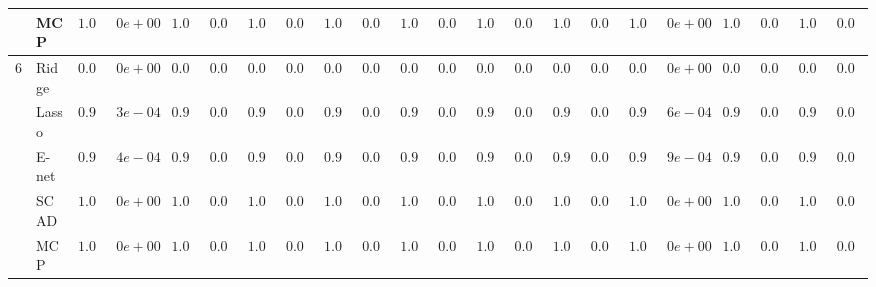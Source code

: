 \begin{tabular}{p{0.2cm}p{1cm}|p{0.6cm}p{0.6cm}|p{0.6cm}p{0.6cm}p{0.6cm}p{0.6cm}p{0.6cm}p{0.6cm}|p{0.6cm}p{0.6cm}p{0.6cm}p{0.6cm}p{0.6cm}p{0.6cm}|p{0.6cm}p{0.6cm}p{0.6cm}p{0.6cm}p{0.6cm}p{0.6cm}}
 & MCP  & $1.0000$ & $0e+00$ & $1.0000$ & $0.0000$ & $1.0000$ & $0.0000$ & $1.0000$ & $0.0000$ & $1.0000$ & $0.0001$ & $1.0000$ & $0.0000$ & $1.0000$ & $0.0000$ & $1.0000$ & $0e+00$ & $1.0000$ & $0.0000$ & $1.0000$ & $0.0000$ \\\hline
6 & Ridge  & $0.0000$ & $0e+00$ & $0.0000$ & $0.0000$ & $0.0000$ & $0.0000$ & $0.0000$ & $0.0000$ & $0.0000$ & $0.0000$ & $0.0000$ & $0.0000$ & $0.0000$ & $0.0000$ & $0.0000$ & $0e+00$ & $0.0000$ & $0.0000$ & $0.0000$ & $0.0000$ \\
 & Lasso  & $0.9999$ & $3e-04$ & $0.9991$ & $0.0013$ & $0.9977$ & $0.0018$ & $0.9974$ & $0.0020$ & $0.9997$ & $0.0009$ & $0.9995$ & $0.0011$ & $0.9890$ & $0.0048$ & $0.9998$ & $6e-04$ & $0.9991$ & $0.0012$ & $0.9949$ & $0.0024$ \\
 & E-net  & $0.9998$ & $4e-04$ & $0.9985$ & $0.0017$ & $0.9963$ & $0.0022$ & $0.9962$ & $0.0024$ & $0.9996$ & $0.0010$ & $0.9991$ & $0.0016$ & $0.9867$ & $0.0052$ & $0.9996$ & $9e-04$ & $0.9985$ & $0.0016$ & $0.9938$ & $0.0027$ \\
 & SCAD  & $1.0000$ & $0e+00$ & $1.0000$ & $0.0000$ & $1.0000$ & $0.0000$ & $1.0000$ & $0.0000$ & $1.0000$ & $0.0001$ & $1.0000$ & $0.0000$ & $1.0000$ & $0.0000$ & $1.0000$ & $0e+00$ & $1.0000$ & $0.0000$ & $1.0000$ & $0.0000$ \\
 & MCP  & $1.0000$ & $0e+00$ & $1.0000$ & $0.0000$ & $1.0000$ & $0.0000$ & $1.0000$ & $0.0000$ & $1.0000$ & $0.0001$ & $1.0000$ & $0.0000$ & $1.0000$ & $0.0000$ & $1.0000$ & $0e+00$ & $1.0000$ & $0.0000$ & $1.0000$ & $0.0000$ \\
\hline 
\end{tabular}


